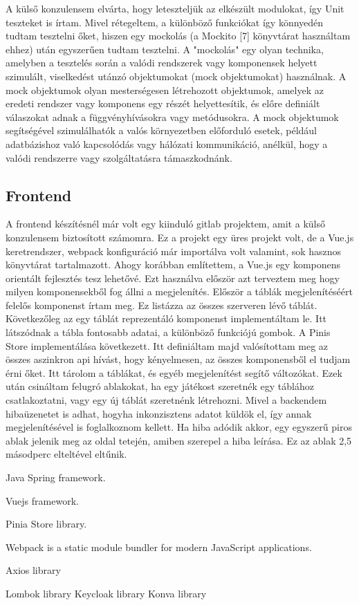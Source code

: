 \documentclass[a4paper,twoside]{article}
\begin{document}
A külső konzulensem elvárta, hogy leteszteljük az elkészült modulokat, így Unit teszteket is
írtam. Mivel rétegeltem, a különböző funkciókat így könnyedén tudtam tesztelni őket, hiszen
egy mockolás (a Mockito [7] könyvtárat használtam ehhez) után egyszerűen tudtam tesztelni.
A "mockolás" egy olyan technika, amelyben a tesztelés során a valódi rendszerek vagy
komponensek helyett szimulált, viselkedést utánzó objektumokat (mock objektumokat) használnak.
A mock objektumok olyan mesterségesen létrehozott objektumok, amelyek az
eredeti rendszer vagy komponens egy részét helyettesítik, és előre definiált válaszokat adnak a
függvényhívásokra vagy metódusokra. A mock objektumok segítségével szimulálhatók a
valós környezetben előforduló esetek, például adatbázishoz való kapcsolódás vagy hálózati
kommunikáció, anélkül, hogy a valódi rendszerre vagy szolgáltatásra támaszkodnánk. 

\subsection{Frontend}
A frontend készítésnél már volt egy kiinduló gitlab projektem, amit a külső konzulensem
biztosított számomra. Ez a projekt egy üres projekt volt, de a Vue.js keretrendszer, webpack
konfiguráció már importálva volt valamint, sok hasznos könyvtárat tartalmazott. Ahogy
korábban említettem, a Vue.js egy komponens orientált fejlesztés tesz lehetővé. Ezt használva
először azt terveztem meg hogy milyen komponensekből fog állni a megjelenítés.
Először a táblák megjelenítéséért felelős komponenst írtam meg. Ez listázza az összes
szerveren lévő táblát.
Következőleg az egy táblát reprezentáló komponenst implementáltam le. Itt látszódnak a tábla
fontosabb adatai, a különböző funkciójú gombok.
A Pinis Store implementálása következett. Itt definiáltam majd valósítottam meg az összes
aszinkron api hívást, hogy kényelmesen, az összes komponensből el tudjam érni őket. Itt
tárolom a táblákat, és egyéb megjelenítést segítő változókat.
Ezek után csináltam felugró ablakokat, ha egy játékost szeretnék egy táblához csatlakoztatni,
vagy egy új táblát szeretnénk létrehozni.
Mivel a backendem hibaüzenetet is adhat, hogyha inkonzisztens adatot küldök el, így annak
megjelenítésével is foglalkoznom kellett. Ha hiba adódik akkor, egy egyszerű piros ablak
jelenik meg az oldal tetején, amiben szerepel a hiba leírása. Ez az ablak 2,5 másodperc
elteltével eltűnik.



\newpage
\begin{thebibliography}{9}
	Java Spring framework.
	
	Vuejs framework.
	
	Pinia Store library.
	
	 Webpack is a static module bundler for modern JavaScript applications.
	 
	 Axios library
	 
	 Lombok library
	 Keycloak library
	 Konva library
\end{thebibliography}
\end{document}

